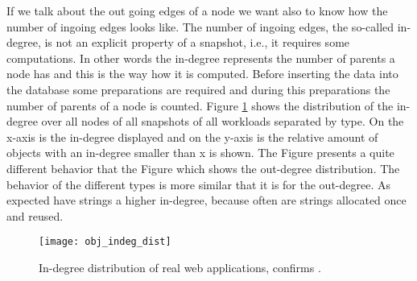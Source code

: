 If we talk about the out going edges of a node we want also to know how the number of ingoing edges looks like. The number of ingoing edges, the so-called in-degree, is not an explicit property of a snapshot, i.e., it requires some computations. In other words the in-degree represents the number of parents a node has and this is the way how it is computed. Before inserting the data into the database some preparations are required and during this preparations the number of parents of a node is counted. Figure \ref{fig:obj_indeg_dist} shows the distribution of the in-degree over all nodes of all snapshots of all workloads separated by type. On the x-axis is the in-degree displayed and on the y-axis is the relative amount of objects with an in-degree smaller than x is shown. The Figure presents a quite different behavior that the Figure which shows the out-degree distribution. The behavior of the different types is more similar that it is for the out-degree. As expected have strings a higher in-degree, because often are strings allocated once and reused.
\begin{figure}
	\centering
	\texttt{[image: obj\_indeg\_dist]}
	\caption{In-degree distribution of real web applications, confirms \cite{JSMeter2009}.}
	\label{fig:obj_indeg_dist}
\end{figure}

